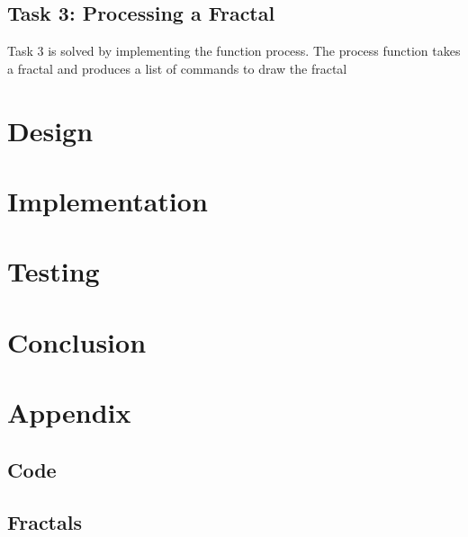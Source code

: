 \documentclass{article}
\begin{document}
\subsection{Task 3: Processing a Fractal}
Task 3 is solved by implementing the function process. The process function takes a fractal and produces a list of commands to draw the fractal

\section{Design}

\section{Implementation}

\section{Testing}

\section{Conclusion}

\section{Appendix}

\subsection{Code}

\subsection{Fractals}
\end{document}
